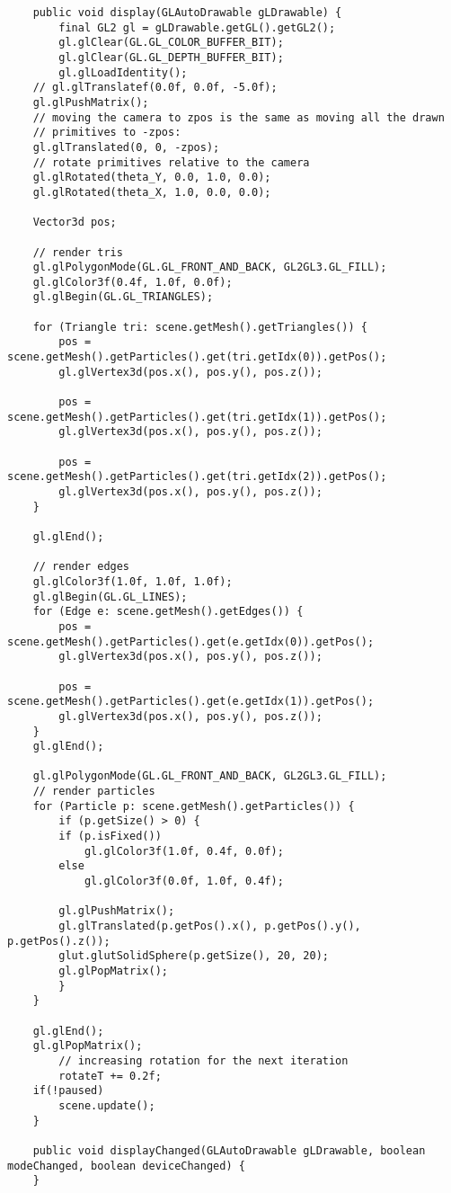 \begin{lstlisting}
    public void display(GLAutoDrawable gLDrawable) {
        final GL2 gl = gLDrawable.getGL().getGL2();
        gl.glClear(GL.GL_COLOR_BUFFER_BIT);
        gl.glClear(GL.GL_DEPTH_BUFFER_BIT);
        gl.glLoadIdentity();
	// gl.glTranslatef(0.0f, 0.0f, -5.0f);
	gl.glPushMatrix();
	// moving the camera to zpos is the same as moving all the drawn
	// primitives to -zpos:
	gl.glTranslated(0, 0, -zpos);
	// rotate primitives relative to the camera
	gl.glRotated(theta_Y, 0.0, 1.0, 0.0);
	gl.glRotated(theta_X, 1.0, 0.0, 0.0);
      
	Vector3d pos;
		
	// render tris
	gl.glPolygonMode(GL.GL_FRONT_AND_BACK, GL2GL3.GL_FILL);
	gl.glColor3f(0.4f, 1.0f, 0.0f);
	gl.glBegin(GL.GL_TRIANGLES);

	for (Triangle tri: scene.getMesh().getTriangles()) {
	    pos = scene.getMesh().getParticles().get(tri.getIdx(0)).getPos();
	    gl.glVertex3d(pos.x(), pos.y(), pos.z());

	    pos = scene.getMesh().getParticles().get(tri.getIdx(1)).getPos();
	    gl.glVertex3d(pos.x(), pos.y(), pos.z());

	    pos = scene.getMesh().getParticles().get(tri.getIdx(2)).getPos();
	    gl.glVertex3d(pos.x(), pos.y(), pos.z());
	}

	gl.glEnd();
		
	// render edges
	gl.glColor3f(1.0f, 1.0f, 1.0f);
	gl.glBegin(GL.GL_LINES);
	for (Edge e: scene.getMesh().getEdges()) {
	    pos = scene.getMesh().getParticles().get(e.getIdx(0)).getPos();
	    gl.glVertex3d(pos.x(), pos.y(), pos.z());

	    pos = scene.getMesh().getParticles().get(e.getIdx(1)).getPos();
	    gl.glVertex3d(pos.x(), pos.y(), pos.z());
	}
	gl.glEnd();
		
	gl.glPolygonMode(GL.GL_FRONT_AND_BACK, GL2GL3.GL_FILL);
	// render particles
	for (Particle p: scene.getMesh().getParticles()) {
	    if (p.getSize() > 0) {
		if (p.isFixed())
		    gl.glColor3f(1.0f, 0.4f, 0.0f);
		else
		    gl.glColor3f(0.0f, 1.0f, 0.4f);
			
		gl.glPushMatrix();
		gl.glTranslated(p.getPos().x(), p.getPos().y(), p.getPos().z());
		glut.glutSolidSphere(p.getSize(), 20, 20);
		gl.glPopMatrix();
	    }
	}

	gl.glEnd();
	gl.glPopMatrix();
        // increasing rotation for the next iteration                                 
        rotateT += 0.2f; 
	if(!paused)
	    scene.update();
    }
 
    public void displayChanged(GLAutoDrawable gLDrawable, boolean modeChanged, boolean deviceChanged) {
    }
 

\end{lstlisting}
